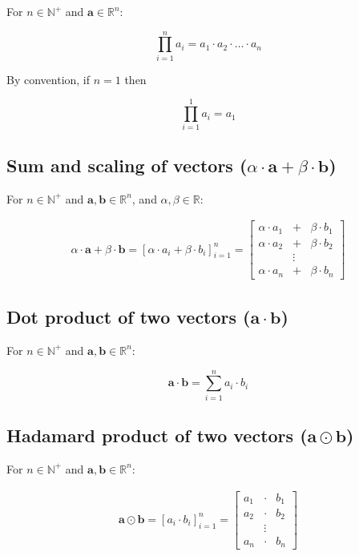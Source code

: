 \documentclass{article}
\begin{document}
        For $n \in \mathbb{N}^+$ and $\mathbf{a} \in \mathbb{R}^n$:

        $$\prod_{i=1}^n a_i = a_1 \cdot a_2 \cdot \ldots \cdot a_n$$

        By convention, if $n=1$ then

        $$\prod_{i=1}^1 a_i = a_1$$

      \subsection{%
        Sum and scaling of vectors
        ($\alpha \cdot \mathbf{a} + \beta \cdot \mathbf{b}$)
      }

        For $n \in \mathbb{N}^+$ and $\mathbf{a}, \mathbf{b} \in \mathbb{R}^n$,
        and $\alpha, \beta \in \mathbb{R}$:

        \begin{align*}
          \alpha \cdot \mathbf{a} + \beta \cdot \mathbf{b}
            = \left[ \alpha \cdot a_i + \beta \cdot b_i \right]_{i=1}^n
            = \begin{bmatrix}
                \alpha \cdot a_1 & + & \beta \cdot b_1 \\
                \alpha \cdot a_2 & + & \beta \cdot b_2 \\
                & \vdots & \\
                \alpha \cdot a_n & + & \beta \cdot b_n
              \end{bmatrix}
        \end{align*}

      \subsection{Dot product of two vectors ($\mathbf{a} \cdot \mathbf{b}$)}

        For $n \in \mathbb{N}^+$ and $\mathbf{a}, \mathbf{b} \in \mathbb{R}^n$:

        $$\mathbf{a} \cdot \mathbf{b} = \sum_{i=1}^n a_i \cdot b_i$$

      \subsection{%
        Hadamard product of two vectors ($\mathbf{a} \odot \mathbf{b}$)
      }

        For $n \in \mathbb{N}^+$ and $\mathbf{a}, \mathbf{b} \in \mathbb{R}^n$:

        \begin{align*}
          \mathbf{a} \odot \mathbf{b}
            = \left[ a_i \cdot b_i \right]_{i=1}^n
            = \begin{bmatrix}
                a_1 & \cdot & b_1 \\
                a_2 & \cdot & b_2 \\
                & \vdots & \\
                a_n & \cdot & b_n
              \end{bmatrix}
        \end{align*}
\end{document}
